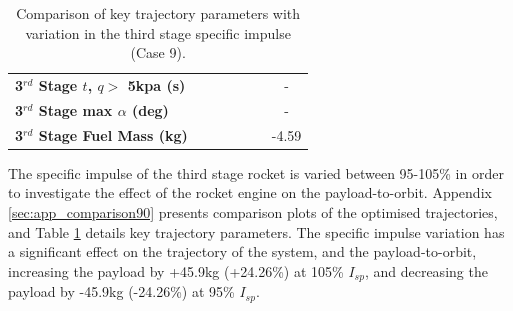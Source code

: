 \begin{table}[ht]
\begin{tabular}{l c c c c c c}
		\textbf{3$^{rd}$ Stage $t$, $q >$ 5kpa (s)}
		& \thirdqOverFiveTThreeNinetyNoReturn
		& \thirdqOverFiveTThreeNinetyFiveNoReturn
		& \thirdqOverFiveTThreeStandardNoReturn
		& \thirdqOverFiveTThreeOneHundredFiveNoReturn
		& \thirdqOverFiveTThreeOneHundredTenNoReturn
		& -
		\\
		\textbf{3$^{rd}$ Stage max $\alpha$ (deg)}
		& \thirdmaxAoATThreeNinetyNoReturn
		& \thirdmaxAoATThreeNinetyFiveNoReturn
		& \thirdmaxAoATThreeStandardNoReturn
		& \thirdmaxAoATThreeOneHundredFiveNoReturn
		& \thirdmaxAoATThreeOneHundredTenNoReturn
		& -
		\\
		\textbf{3$^{rd}$ Stage Fuel Mass (kg)}
		& \thirdmFuelTThreeNinetyNoReturn
		& \thirdmFuelTThreeNinetyFiveNoReturn
		& \thirdmFuelTThreeStandardNoReturn
		& \thirdmFuelTThreeOneHundredFiveNoReturn
		& \thirdmFuelTThreeOneHundredTenNoReturn
		&-4.59
		\\
		\hline 
	\end{tabular} 
	\caption{Comparison of key trajectory parameters with variation in the third stage specific impulse (Case 9).}
	\label{tab:comparison90}
\end{table}

The specific impulse of the third stage rocket is varied between 95-105\% in order to investigate the effect of the rocket engine on the payload-to-orbit. Appendix \ref{sec:app_comparison90} presents comparison plots of the optimised trajectories, and Table \ref{tab:comparison90} details key trajectory parameters. 
The specific impulse variation has a significant effect on the trajectory of the system, and the payload-to-orbit, increasing the payload by +45.9kg (+24.26\%) at 105\% $I_{sp}$, and decreasing the payload by -45.9kg (-24.26\%) at 95\% $I_{sp}$. 

